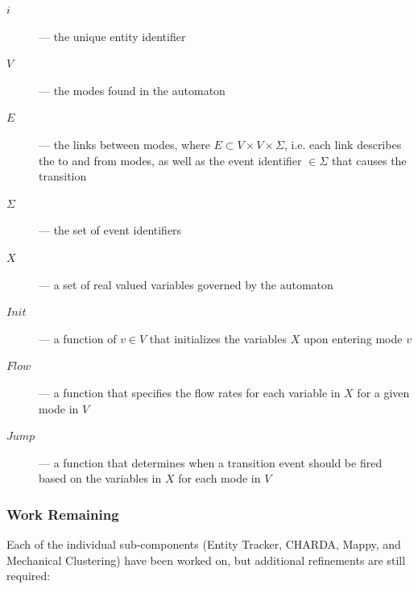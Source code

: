 \documentclass[a4paper]{article}
\begin{document}
\begin{description}
\item[$i$] --- the unique entity identifier
\item[$V$] --- the modes found in the automaton
\item[$E$] --- the links between modes, where $E \subset V \times V \times \Sigma$, i.e. each link describes the to and from modes, as well as the event identifier $\in \Sigma$ that causes the transition
\item[$\Sigma$] --- the set of event identifiers
\item[$X$] --- a set of real valued variables governed by the automaton
\item[$Init$] --- a function of $v\in V$ that initializes the variables $X$ upon entering mode $v$
\item[$Flow$] --- a function that specifies the flow rates for each variable in $X$ for a given mode in $V$
\item[$Jump$] --- a function that determines when a transition event should be fired based on the variables in $X$ for each mode in $V$

\end{description}

\subsubsection{Work Remaining}

Each of the individual sub-components (Entity Tracker, CHARDA, Mappy, and Mechanical Clustering) have been worked on, but additional refinements are still required:
\end{document}
